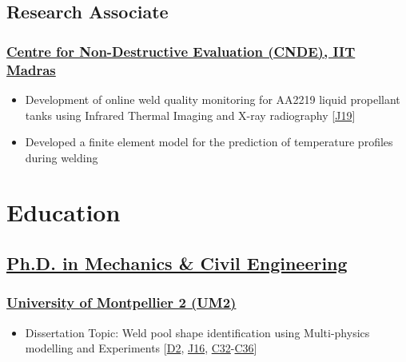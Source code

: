 \documentclass{my_cv}%
\begin{document}
\subsection{Research Associate}
\subsubsection{\href{https://www.cnde.in/}{Centre for Non-Destructive Evaluation (CNDE), IIT Madras}}
\begin{itemize}[leftmargin=0.15in]
\setlength\itemsep{-0.1em}
\color{mygray}
\item Development of online weld quality monitoring for AA2219 liquid propellant tanks using Infrared Thermal Imaging and X-ray radiography [\textcolor{mypink}{\hyperref[J19]{J19}}]
\item Developed a finite element model for the prediction of temperature profiles during welding
\end{itemize}
\section{Education}
\vspace{2em}
\subsection{\href{https://adum.fr/as/ed/cv.pl?mat=39446&site=adumR} {Ph.D. in Mechanics \& Civil Engineering}}
\subsubsection{\faInstitution \hspace{0.2em} \href{https://www.umontpellier.fr/en/}{University of Montpellier 2 (UM2)}}
\begin{itemize}[leftmargin=0.15in]
\setlength\itemsep{-0.1em}
\color{mygray}
\item Dissertation Topic: Weld pool shape identification using Multi-physics modelling and Experiments [\textcolor{mypink}{\hyperref[D2]{D2}}, \textcolor{mypink}{\hyperref[J16]{J16}}, \textcolor{mypink}{\hyperref[C32]{C32}}-\textcolor{mypink}{\hyperref[C36]{C36}}]
\end{itemize}
{\color{mygray1} \hdashrule[0.1ex]{18.8cm}{0.2mm}{1mm}}
\end{document}
